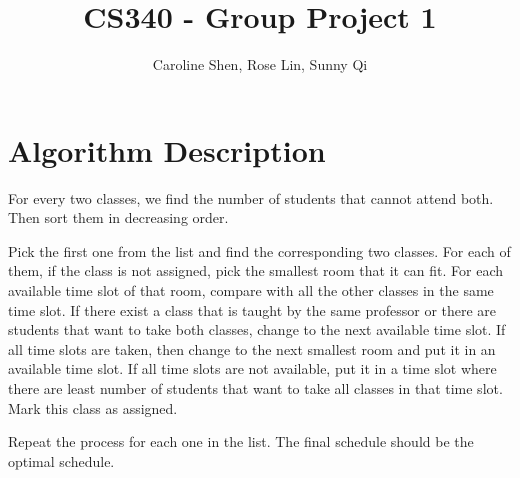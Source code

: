 \documentclass[11pt, oneside]{article}   	%
\title{CS340 - Group Project 1}
\author{Caroline Shen, Rose Lin, Sunny Qi}
\date{}							%
\begin{document}
\maketitle


\section{Algorithm Description}
For every two classes, we find the number of students that cannot attend both. Then sort them in decreasing order. 

Pick the first one from the list and find the corresponding two classes. For each of them, if the class is not assigned, pick the smallest room that it can fit. For each available time slot of that room, compare with all the other classes in the same time slot. If there exist a class that is taught by the same professor or there are students that want to take both classes, change to the next available time slot. If all time slots are taken, then change to the next smallest room and put it in an available time slot. If all time slots are not available, put it in a time slot where there are least number of students that want to take all classes in that time slot. Mark this class as assigned. 

Repeat the process for each one in the list. The final schedule should be the optimal schedule.

\section{}
\begin{algorithm}[H]
\end{algorithm}
\end{document}
